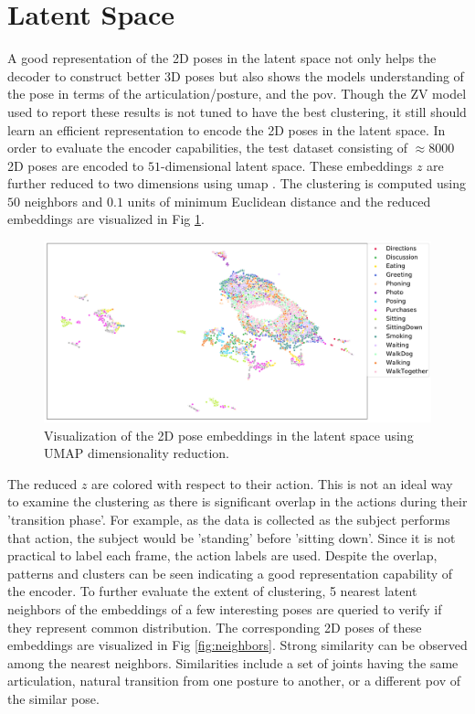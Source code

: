 

\section{Latent Space}
A good representation of the 2D poses in the latent space not only helps the decoder to construct better 3D poses but also shows the models understanding of the pose in terms of the articulation/posture, and the \ac{pov}. Though the ZV model used to report these results is not tuned to have the best clustering, it still should learn an efficient representation to encode the 2D poses in the latent space. In order to evaluate the encoder capabilities, the test dataset consisting of $\approx 8000$ 2D poses are encoded to $51$-dimensional latent space. These embeddings $z$ are further reduced to two dimensions using \ac{umap} \cite{umap}. The clustering is computed using $50$ neighbors and $0.1$ units of minimum Euclidean distance and the reduced embeddings are visualized in Fig \ref{fig:latentspace}.

\begin{figure}[h]
    \centering
    \includegraphics[width=\linewidth]{figures/results/umap.pdf}
    \caption{Visualization of the 2D pose embeddings in the latent space using UMAP dimensionality reduction.}
    \label{fig:latentspace}
\end{figure}

The reduced $z$ are colored with respect to their action. This is not an ideal way to examine the clustering as there is significant overlap in the actions during their 'transition phase'. For example, as the data is collected as the subject performs that action, the subject would be 'standing' before 'sitting down'. Since it is not practical to label each frame, the action labels are used. Despite the overlap, patterns and clusters can be seen indicating a good representation capability of the encoder. To further evaluate the extent of clustering, 5 nearest latent neighbors of the embeddings of a few interesting poses are queried to verify if they represent common distribution. The corresponding 2D poses of these embeddings are visualized in Fig \ref{fig:neighbors}. Strong similarity can be observed among the nearest neighbors. Similarities include a set of joints having the same articulation, natural transition from one posture to another, or a different \ac{pov} of the similar pose. 


